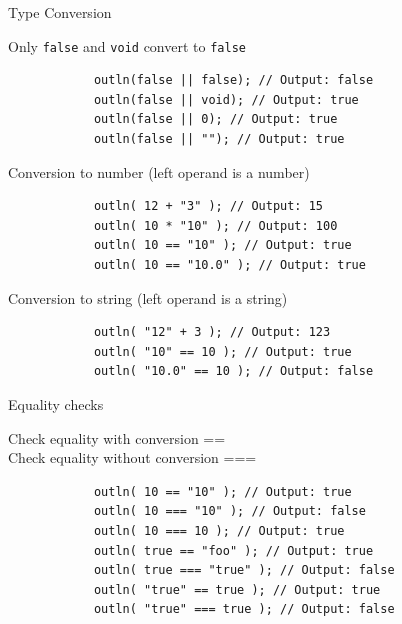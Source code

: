 \documentclass[ucs,9pt]{beamer}
\begin{document}
\begin{frame}[fragile]{Type Conversion}
	\begin{block}{Only \lstinline!false!  and \lstinline!void!  convert to \lstinline!false! }
		\begin{lstlisting}
			outln(false || false); // Output: false
			outln(false || void); // Output: true
			outln(false || 0); // Output: true
			outln(false || ""); // Output: true
		\end{lstlisting}
	\end{block}
	\pause
	\begin{block}{Conversion to number (left operand is a number)}
		\begin{lstlisting}
			outln( 12 + "3" ); // Output: 15
			outln( 10 * "10" ); // Output: 100
			outln( 10 == "10" ); // Output: true
			outln( 10 == "10.0" ); // Output: true
		\end{lstlisting}
	\end{block}
	\pause
	\begin{block}{Conversion to string (left operand is a string)}
		\begin{lstlisting}
			outln( "12" + 3 ); // Output: 123
			outln( "10" == 10 ); // Output: true
			outln( "10.0" == 10 ); // Output: false
		\end{lstlisting}
	\end{block}
\end{frame}

\begin{frame}[fragile]{Equality checks}
		\begin{block}{Check equality with conversion == \\
		Check equality without conversion === }
		\begin{lstlisting}
			outln( 10 == "10" ); // Output: true
			outln( 10 === "10" ); // Output: false
			outln( 10 === 10 ); // Output: true
			outln( true == "foo" ); // Output: true
			outln( true === "true" ); // Output: false
			outln( "true" == true ); // Output: true
			outln( "true" === true ); // Output: false
		\end{lstlisting}
	\end{block}
\end{frame}
\end{document}
